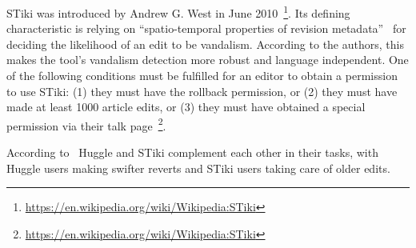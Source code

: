 STiki was introduced by Andrew G. West in June 2010~\footnote{\url{https://en.wikipedia.org/wiki/Wikipedia:STiki}}.
Its defining characteristic is relying on ``spatio-temporal properties of revision metadata''~\cite{WestKanLee2010} for deciding the likelihood of an edit to be vandalism.
According to the authors, this makes the tool's vandalism detection more robust and language independent.
One of the following conditions must be fulfilled for an editor to obtain a permission to use STiki:
(1) they must have the rollback permission, or
(2) they must have made at least 1000 article edits, or
(3) they must have obtained a special permission via their talk page~\footnote{\url{https://en.wikipedia.org/wiki/Wikipedia:STiki}}.

According to~\cite{GeiHal2013} Huggle and STiki complement each other in their tasks, with Huggle users making swifter reverts and STiki users taking care of older edits.

